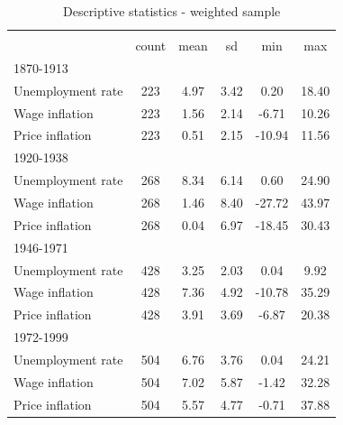 \begin{table}[htbp]\centering
\def\sym#1{\ifmmode^{#1}\else\(^{#1}\)\fi}
\caption{Descriptive statistics - weighted sample \label{T:DescriptivesW}}
\begin{tabular}{l*{1}{ccccc}}
\hline\hline
                    &\multicolumn{5}{c}{}                                            \\
                    &       count&        mean&          sd&         min&         max\\
\hline
1870-1913           &            &            &            &            &            \\
Unemployment rate   &         223&        4.97&        3.42&        0.20&       18.40\\
Wage inflation      &         223&        1.56&        2.14&       -6.71&       10.26\\
Price inflation     &         223&        0.51&        2.15&      -10.94&       11.56\\
\hline
1920-1938           &            &            &            &            &            \\
Unemployment rate   &         268&        8.34&        6.14&        0.60&       24.90\\
Wage inflation      &         268&        1.46&        8.40&      -27.72&       43.97\\
Price inflation     &         268&        0.04&        6.97&      -18.45&       30.43\\
\hline
1946-1971           &            &            &            &            &            \\
Unemployment rate   &         428&        3.25&        2.03&        0.04&        9.92\\
Wage inflation      &         428&        7.36&        4.92&      -10.78&       35.29\\
Price inflation     &         428&        3.91&        3.69&       -6.87&       20.38\\
\hline
1972-1999           &            &            &            &            &            \\
Unemployment rate   &         504&        6.76&        3.76&        0.04&       24.21\\
Wage inflation      &         504&        7.02&        5.87&       -1.42&       32.28\\
Price inflation     &         504&        5.57&        4.77&       -0.71&       37.88\\

\end{tabular}
\end{table}
